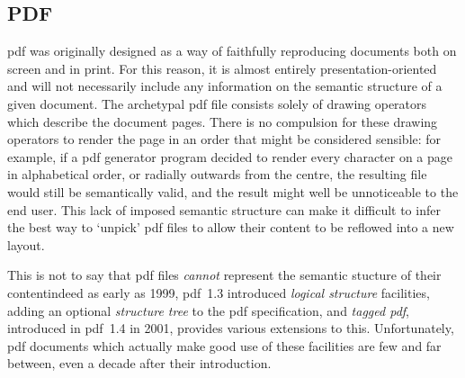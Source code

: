 \subsection{PDF}
\gls{pdf} was originally designed as a way of faithfully reproducing documents both on screen and in
print. For this reason, it is almost entirely pre\-s\-en\-ta\-tion-oriented and will not necessarily
include any information on the semantic structure of a given document. The archetypal \gls{pdf}
file consists solely of drawing operators which describe the document pages. There is no
compulsion for these drawing operators to render the page in an order that might be considered
sensible: for example, if a \gls{pdf} generator program decided to render every character on a page in
alphabetical order, or radially outwards from the centre, the resulting file would still be
semantically valid, and the result might well be unnoticeable to the end user. This lack of imposed
semantic structure can make it difficult to infer the best way to `unpick' \gls{pdf} files to allow
their content to be reflowed into a new layout.

This is not to say that \gls{pdf} files \emph{cannot} represent the semantic stucture of their
content\ed indeed as early as 1999, \gls{pdf}~1.3 introduced \emph{logical structure}
facilities\cite{Adobe2001}, adding an optional \emph{structure tree} to the \gls{pdf} specification,
and \emph{tagged \gls{pdf}}, introduced in \gls{pdf}~1.4 in 2001, provides various extensions to this.
Unfortunately, \gls{pdf} documents which actually make good use of these facilities are few and far
between, even a decade after their introduction.


